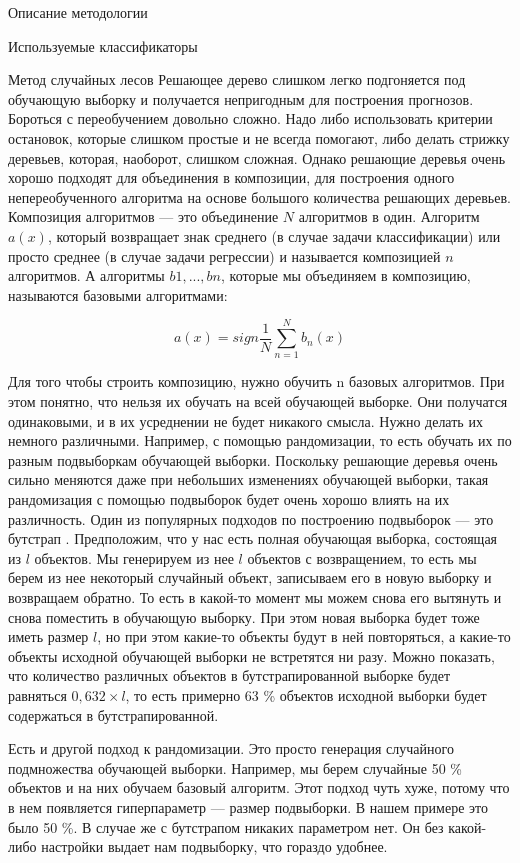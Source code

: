\begin{section}{Описание методологии}
\begin{subsection}{Используемые классификаторы}
    \begin{subsubsection}{Метод случайных лесов}
	\label{rf}
      Решающее дерево слишком легко подгоняется под обучающую выборку и получается непригодным для построения прогнозов. Бороться с переобучением довольно сложно. Надо либо использовать критерии остановок, которые слишком простые и не всегда помогают, либо делать стрижку деревьев, которая, наоборот, слишком сложная. Однако решающие деревья очень хорошо подходят для объединения в композиции, для построения одного непереобученного алгоритма на основе большого количества решающих деревьев. Композиция алгоритмов — это объединение $N$ алгоритмов в один. Алгоритм $a(x)$, который возвращает знак среднего (в случае задачи классификации) или просто среднее (в случае задачи регрессии) и называется композицией $n$ алгоритмов. А алгоритмы $b1, ..., bn$, которые мы объединяем в композицию, называются базовыми алгоритмами:

		\begin{equation}
		a(x) = sign \frac{1}{N}  \sum\limits_{n=1}^N b_n(x)
		\end{equation}

 Для того чтобы строить композицию, нужно обучить n базовых алгоритмов. При этом понятно, что нельзя их обучать на всей обучающей выборке. Они получатся одинаковыми, и в их усреднении не будет никакого смысла. Нужно делать их немного различными. Например, с помощью рандомизации, то есть обучать их по разным подвыборкам обучающей выборки. Поскольку решающие деревья очень сильно меняются даже при небольших изменениях обучающей выборки, такая рандомизация с помощью подвыборок будет очень хорошо влиять на их различность. Один из популярных подходов по построению подвыборок — это бутстрап \cite{wiki:rf}. Предположим, что у нас есть полная обучающая выборка, состоящая из $l$ объектов. Мы генерируем из нее $l$ объектов с возвращением, то есть мы берем из нее некоторый случайный объект, записываем его в новую выборку и возвращаем обратно. То есть в какой-то момент мы можем снова его вытянуть и снова поместить в обучающую выборку. При этом новая выборка будет тоже иметь размер $l$, но при этом какие-то объекты будут в ней повторяться, а какие-то объекты исходной обучающей выборки не встретятся ни разу.  Можно показать, что количество различных объектов в бутстрапированной выборке будет равняться $0,632 \times l$, то есть примерно 63 \% объектов исходной выборки будет содержаться в бутстрапированной.

 Есть и другой подход к рандомизации. Это просто генерация случайного подмножества обучающей выборки. Например, мы берем случайные 50 \% объектов и на них обучаем базовый алгоритм. Этот подход чуть хуже, потому что в нем появляется гиперпараметр — размер подвыборки. В нашем примере это было 50 \%. В случае же с бутстрапом никаких параметром нет. Он без какой-либо настройки выдает нам подвыборку, что гораздо удобнее.


\end{subsubsection}
\end{subsection}
\end{section}
